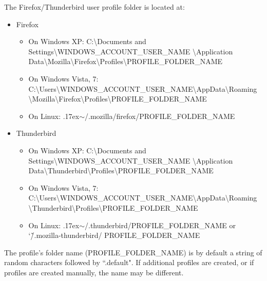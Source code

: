 The Firefox/Thunderbird user profile folder is located at: 
\begin{itemize}
  \item Firefox \begin{itemize}
    \item On Windows XP: C:\textbackslash Documents and Settings\textbackslash WINDOWS\_ACCOUNT\_USER\_NAME \textbackslash Application Data\textbackslash Mozilla\textbackslash Firefox\textbackslash Profiles\textbackslash PROFILE\_FOLDER\_NAME
    \item On Windows Vista, 7: C:\textbackslash Users\textbackslash WINDOWS\_ACCOUNT\_USER\_NAME\textbackslash AppData\textbackslash Roaming \textbackslash Mozilla\textbackslash Firefox\textbackslash Profiles\textbackslash PROFILE\_FOLDER\_NAME
    \item On Linux: {\raise.17ex\hbox{$\scriptstyle\sim$}}/.mozilla/firefox/PROFILE\_FOLDER\_NAME
  \end{itemize}
  \item Thunderbird \begin{itemize}
    \item On Windows XP: C:\textbackslash Documents and Settings\textbackslash WINDOWS\_ACCOUNT\_USER\_NAME \textbackslash Application Data\textbackslash Thunderbird\textbackslash Profiles\textbackslash PROFILE\_FOLDER\_NAME
    \item On Windows Vista, 7: C:\textbackslash Users\textbackslash WINDOWS\_ACCOUNT\_USER\_NAME\textbackslash AppData\textbackslash Roaming \textbackslash Thunderbird\textbackslash Profiles\textbackslash PROFILE\_FOLDER\_NAME
    \item On Linux: {\raise.17ex\hbox{$\scriptstyle\sim$}}/.thunderbird/PROFILE\_FOLDER\_NAME or \char`\~/.mozilla-thunderbird/ PROFILE\_FOLDER\_NAME
  \end{itemize}
\end{itemize}
The profile's folder name (PROFILE\_FOLDER\_NAME) is by default a string of random characters followed by ``.default". If additional profiles are created, or if profiles are created manually, the name may be different. 

